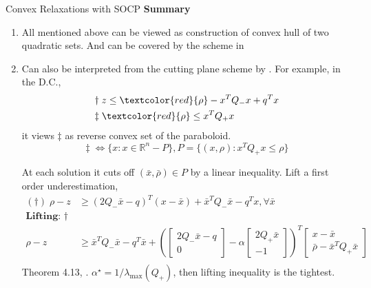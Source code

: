\documentclass[aspectratio=1610, 10pt]{beamer}
\newcommand{\red}[1]{\textcolor{red}{#1}}
\begin{document}
\begin{frame}[allowframebreaks]{Convex Relaxations with SOCP}
  \framebreak
  \textbf{Summary}
  \begin{enumerate}
    \item All mentioned above can be viewed as construction of convex hull of two quadratic sets. And can be covered by the scheme in \cite{burer_how_2017}
    \item Can also be interpreted from the cutting plane scheme by \cite{bienstock_cutting-planes_2014}. For example, in the D.C.,
          \begin{align*}
            \dagger\;  & z \le \textcolor{red}{\rho} - x^TQ_-x + q^Tx \\
            \ddagger\; & \red{\rho} \le x^TQ_+x                       \\
          \end{align*}
          it views \(\ddagger\) as reverse convex set of the paraboloid.
          \begin{equation}
            \ddagger\; \Leftrightarrow \{x: x\in \mathbb R^n - P\}, P = \{(x, \rho) : x^TQ_+x \le \rho\}
          \end{equation}

          \framebreak

          At each solution it cuts off \((\bar x, \bar \rho) \in P\) by a linear inequality.
          Lift a first order underestimation,
          \begin{align*}
            (\dagger)\; \rho - z & \ge \left(2Q_-\bar x - q\right)^T(x-\bar x) + \bar x^TQ_-\bar x - q^Tx, \forall \bar x \\
            \textbf{Lifting: } \dagger                                                                                    \\
            \rho - z             & \ge \bar{x}^{T} Q_- \bar{x} - q^{T} \bar{x}
            +\left(
            \begin{bmatrix} 2Q_-\bar x - q \\ 0 \end{bmatrix} - \alpha
            \begin{bmatrix} 2Q_+ \bar{x} \\ -1 \end{bmatrix}
            \right)^{T}\begin{bmatrix}
              x-\bar{x} \\
              \bar\rho-\bar{x}^{T} Q_+ \bar{x}
            \end{bmatrix}                                                                         \\
          \end{align*}
          Theorem 4.13, \cite{bienstock_cutting-planes_2014}. \(\alpha^\star = 1/\lambda_{\max} (Q_+)\), then lifting inequality is the tightest.


\end{enumerate}
\end{frame}
\end{document}
